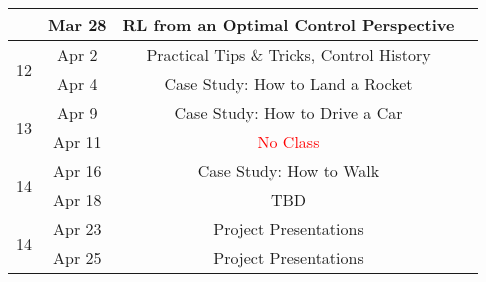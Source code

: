\documentclass[11pt,letterpaper]{article}
\begin{document}
\begin{tabular}{c|c|c|c}
	 & Mar 28 & RL from an Optimal Control Perspective &   \\
	 \hline
	\multirow{2}{*}{12}  & Apr 2 & Practical Tips \& Tricks, Control History 
         &   \\
	 & Apr 4 & Case Study: How to Land a Rocket &   \\
	 \hline
	\multirow{2}{*}{13}  & Apr 9 & Case Study: How to Drive a Car
         &  \\
	 & Apr 11 & \textcolor{red}{No Class} &   \\
	 \hline
	\multirow{2}{*}{14}  & Apr 16 & Case Study: How to Walk
         &  \\
	 & Apr 18 &  TBD &   \\
	 \hline
	\multirow{2}{*}{14}  & Apr 23 &
        Project Presentations &  \\
	 & Apr 25 & Project Presentations &   \\
\end{tabular}
\end{document}
